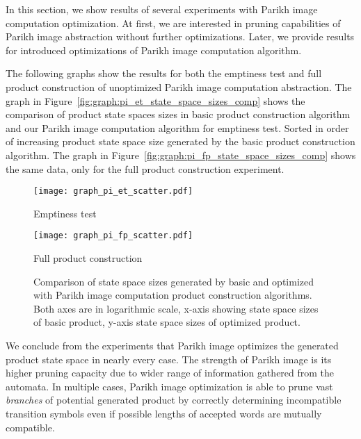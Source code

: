 In this section, we show results of several experiments with Parikh image computation optimization. At first, we are interested in pruning capabilities of Parikh image abstraction without further optimizations. Later, we provide results for introduced optimizations of Parikh image computation algorithm.

The following graphs show the results for both the emptiness test and full product construction of unoptimized Parikh image computation abstraction. The graph in Figure~\ref{fig:graph:pi_et_state_space_sizes_comp} shows the comparison of product state spaces sizes in basic product construction algorithm and our Parikh image computation algorithm for emptiness test. Sorted in order of increasing product state space size generated by the basic product construction algorithm. The graph in Figure~\ref{fig:graph:pi_fp_state_space_sizes_comp} shows the same data, only for the full product construction experiment.

\begin{figure*}[ht]
    \centering
    \begin{minipage}{0.49\linewidth}
        \centering
        \texttt{[image: graph\_pi\_et\_scatter.pdf]}
        \caption{Emptiness test}
        \label{fig:graph:pi_et_state_space_sizes_comp}
    \end{minipage}
    \hfill
    \begin{minipage}{0.49\linewidth}
        \centering
        \texttt{[image: graph\_pi\_fp\_scatter.pdf]}
        \caption{Full product construction}
        \label{fig:graph:pi_fp_state_space_sizes_comp}
    \end{minipage}
    \vspace{0.5cm}
    \caption{Comparison of state space sizes generated by basic and optimized with Parikh image computation product construction algorithms. Both axes are in logarithmic scale, x-axis showing state space sizes of basic product, y-axis state space sizes of optimized product.}
    \label{fig:graph:pi_product_state_space_sizes}
\end{figure*}

We conclude from the experiments that Parikh image optimizes the generated product state space in nearly every case. The strength of Parikh image is its higher pruning capacity due to wider range of information gathered from the automata. In multiple cases, Parikh image optimization is able to prune vast \emph{branches} of potential generated product by correctly determining incompatible transition symbols even if possible lengths of accepted words are mutually compatible.

